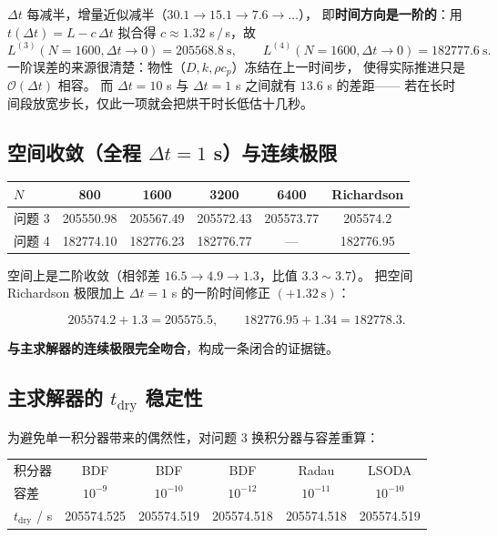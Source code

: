 \documentclass[11pt,a4paper]{article}
\theoremstyle{definition}
\begin{document}
$\Delta t$ 每减半，增量近似减半（$30.1\to15.1\to7.6\to\dots$），
即\textbf{时间方向是一阶的}：用 $t(\Delta t)=L-c\,\Delta t$ 拟合得
$c\approx1.32$ s$\,/\,$s，故
\[
L^{(3)}(N=1600,\Delta t\to0)=205568.8\ \mathrm{s},\qquad
L^{(4)}(N=1600,\Delta t\to0)=182777.6\ \mathrm{s}.
\]
一阶误差的来源很清楚：物性（$D,k,\rho c_p$）冻结在上一时间步，
使得实际推进只是 $\mathcal{O}(\Delta t)$ 相容。
而 $\Delta t=10$ s 与 $\Delta t=1$ s 之间就有 $13.6$ s 的差距——
若在长时间段放宽步长，仅此一项就会把烘干时长低估十几秒。

\subsection{空间收敛（全程 $\Delta t=1$ s）与连续极限}

\begin{center}
\small
\begin{tabular}{@{}lccccc@{}}
\toprule
$N$ & 800 & 1600 & 3200 & 6400 & Richardson \\
\midrule
问题 3 & 205550.98 & 205567.49 & 205572.43 & 205573.77 & 205574.2 \\
问题 4 & 182774.10 & 182776.23 & 182776.77 & --- & 182776.95 \\
\bottomrule
\end{tabular}
\end{center}

空间上是二阶收敛（相邻差 $16.5\to4.9\to1.3$，比值 $3.3\sim3.7$）。
把空间 Richardson 极限加上 $\Delta t=1$ s 的一阶时间修正 $(+1.32\ \mathrm{s})$：

\[
205574.2+1.3=\mathbf{205575.5},\qquad
182776.95+1.34=\mathbf{182778.3}.
\]

\textbf{与主求解器的连续极限完全吻合}，构成一条闭合的证据链。

\subsection{主求解器的 $t_{\text{dry}}$ 稳定性}

为避免单一积分器带来的偶然性，对问题 3 换积分器与容差重算：

\begin{center}
\small
\begin{tabular}{@{}lccccc@{}}
\toprule
积分器 & BDF & BDF & BDF & Radau & LSODA \\
容差 & $10^{-9}$ & $10^{-10}$ & $10^{-12}$ & $10^{-11}$ & $10^{-10}$ \\
\midrule
$t_{\text{dry}}$ / s & 205574.525 & 205574.519 & 205574.518 & 205574.518 & 205574.519 \\
\bottomrule
\end{tabular}
\end{center}
\end{document}
